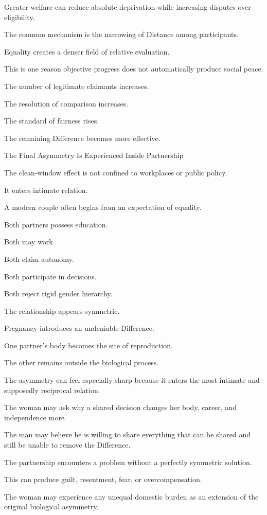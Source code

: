 Greater welfare can reduce absolute deprivation while increasing disputes over eligibility.

The common mechanism is the narrowing of Distance among participants.

Equality creates a denser field of relative evaluation.

This is one reason objective progress does not automatically produce social peace.

The number of legitimate claimants increases.

The resolution of comparison increases.

The standard of fairness rises.

The remaining Difference becomes more effective.

The Final Asymmetry Is Experienced Inside Partnership

The clean-window effect is not confined to workplaces or public policy.

It enters intimate relation.

A modern couple often begins from an expectation of equality.

Both partners possess education.

Both may work.

Both claim autonomy.

Both participate in decisions.

Both reject rigid gender hierarchy.

The relationship appears symmetric.

Pregnancy introduces an undeniable Difference.

One partner’s body becomes the site of reproduction.

The other remains outside the biological process.

The asymmetry can feel especially sharp because it enters the most intimate and supposedly reciprocal relation.

The woman may ask why a shared decision changes her body, career, and independence more.

The man may believe he is willing to share everything that can be shared and still be unable to remove the Difference.

The partnership encounters a problem without a perfectly symmetric solution.

This can produce guilt, resentment, fear, or overcompensation.

The woman may experience any unequal domestic burden as an extension of the original biological asymmetry.

